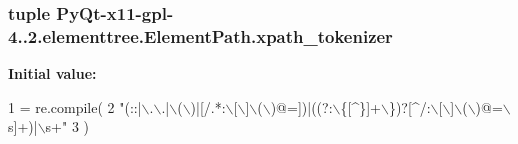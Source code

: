 \subsubsection[{xpath\+\_\+tokenizer}]{\setlength{\rightskip}{0pt plus 5cm}tuple Py\+Qt-\/x11-\/gpl-\/4..\+2.elementtree.\+Element\+Path.\+xpath\+\_\+tokenizer}\label{namespacePyQt-x11-gpl-4_811_82_1_1elementtree_1_1ElementPath_a9e036096b77bee66b92083b8fb2b1c2a}
{\bfseries Initial value\+:}
\begin{DoxyCode}
1 = re.compile(
2     \textcolor{stringliteral}{"(::|\(\backslash\).\(\backslash\).|\(\backslash\)(\(\backslash\))|[/.*:\(\backslash\)[\(\backslash\)]\(\backslash\)(\(\backslash\))@=])|((?:\(\backslash\)\{[^\}]+\(\backslash\)\})?[^/:\(\backslash\)[\(\backslash\)]\(\backslash\)(\(\backslash\))@=\(\backslash\)s]+)|\(\backslash\)s+"}
3     )
\end{DoxyCode}

